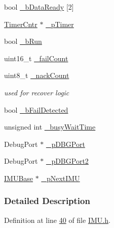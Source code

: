\begin{DoxyCompactItemize}
bool \hyperlink{class_i_m_u_a8a71f0728b2d849d1d8e54fcb58aad4e}{\_\-bDataReady} \mbox{[}2\mbox{]}
\item 
\hyperlink{class_timer_cntr}{TimerCntr} $\ast$ \hyperlink{class_i_m_u_a16e73b1457a346aed16d4b61fae7f2c4}{\_\-pTimer}
\item 
bool \hyperlink{class_i_m_u_a547fe1fb8adb34917aa08663919b97df}{\_\-bRun}
\item 
uint16\_\-t \hyperlink{class_i_m_u_a1e646aa38b84721fc650ef5d3388cc14}{\_\-failCount}
\item 
uint8\_\-t \hyperlink{class_i_m_u_a30c8553ab21b5d6e618c2616f25dafb1}{\_\-nackCount}
\begin{DoxyCompactList}\small\item\em used for recover logic \item\end{DoxyCompactList}\item 
bool \hyperlink{class_i_m_u_a12238a84e20f54c5fe799e0b37feb0ea}{\_\-bFailDetected}
\item 
unsigned int \hyperlink{class_i_m_u_adce31ce2a3317918d73b47e94a2d9227}{\_\-busyWaitTime}
\item 
DebugPort $\ast$ \hyperlink{class_i_m_u_a83a2ffaf84cc04f17ff0301181c45366}{\_\-pDBGPort}
\item 
DebugPort $\ast$ \hyperlink{class_i_m_u_a1cf5672a28049d5885a2958010188928}{\_\-pDBGPort2}
\item 
\hyperlink{class_i_m_u_base}{IMUBase} $\ast$ \hyperlink{class_i_m_u_a72d5aa462d6627b458db76ca6567d130}{\_\-pNextIMU}
\end{DoxyCompactItemize}


\subsubsection{Detailed Description}


Definition at line \hyperlink{_i_m_u_8h_source_l00040}{40} of file \hyperlink{_i_m_u_8h_source}{IMU.h}.



